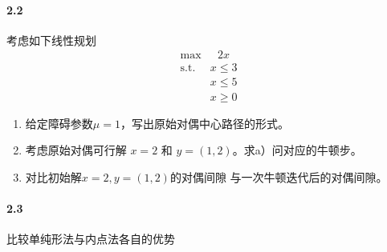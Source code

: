 \documentclass[12pt,a4paper]{article}
\begin{document}
\paragraph{2.2}
考虑如下线性规划
\begin{align*}
\max & \,\,\,\, 2x\\
\text{s.t. } & x \leq 3 \\
& x \leq 5 \\
& x \geq 0
\end{align*}


\begin{enumerate}
	\item[(a)] 给定障碍参数$\mu=1$，写出原始对偶中心路径的形式。
	
	\item[(b)] 考虑原始对偶可行解 $x=2$ 和 $y=(1,2)$。求a）问对应的牛顿步。
	
	\item [(c)] 对比初始解$x=2, y=(1,2)$的对偶间隙 与一次牛顿迭代后的对偶间隙。
	
\end{enumerate}


\paragraph{2.3}
比较单纯形法与内点法各自的优势
\end{document}
